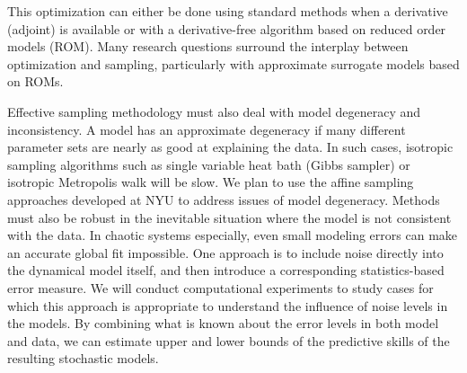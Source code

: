 \documentclass[11pt]{article}
\begin{document}
This optimization can either be done using standard methods when a derivative (adjoint) is available
or with a derivative-free algorithm based on reduced order models (ROM).
Many research questions surround the interplay between optimization and
sampling, particularly with approximate surrogate models based on ROMs.

Effective sampling methodology must also deal with model degeneracy and inconsistency.
A model has an approximate degeneracy if many different parameter sets are nearly as good at explaining the data.
In such cases, isotropic sampling algorithms such as single variable heat bath (Gibbs sampler) or isotropic
Metropolis walk will be slow. We plan to use the affine sampling approaches developed at NYU to address issues of model degeneracy.
Methods must also be robust in the inevitable situation where the model is not consistent with the
data.
In chaotic systems especially, even small modeling errors can make an accurate global fit impossible.
One approach is to include noise directly into the dynamical model
itself, and then introduce a corresponding statistics-based error measure. We will conduct computational experiments to study
cases for which this approach is appropriate to understand the
influence of noise levels in the models.
By combining what is known about the error levels in both model and data, we can estimate upper and lower bounds
of the predictive skills of the resulting stochastic models.
\end{document}
